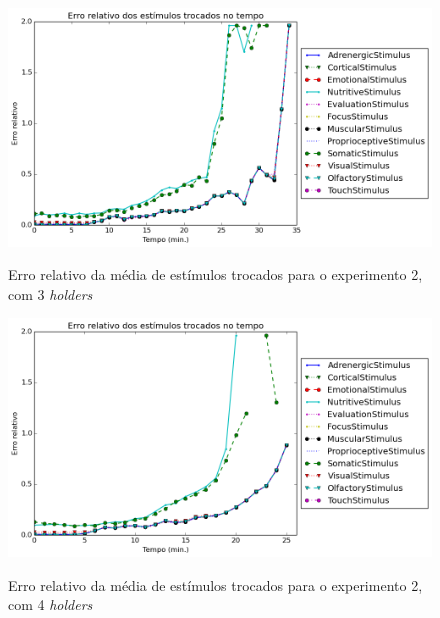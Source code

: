 \begin{apendicesenv}
\begin{figure}[H]
 \centering
 \caption{Erro relativo da média de estímulos trocados para o experimento 2, com 3 \textit{holders}}
 \includegraphics[scale=0.6]{04-figuras/experiments/exp_2/3/avgExchangedStimuliOverTime_err.png}
 \label{fig:exp_3_3_avgExchStimuli_err}
\end{figure}

\begin{figure}[H]
 \centering
 \caption{Erro relativo da média de estímulos trocados para o experimento 2, com 4 \textit{holders}}
 \includegraphics[scale=0.6]{04-figuras/experiments/exp_2/4/avgExchangedStimuliOverTime_err.png}
 \label{fig:exp_3_4_avgExchStimuli_err}
\end{figure}


\end{apendicesenv}
